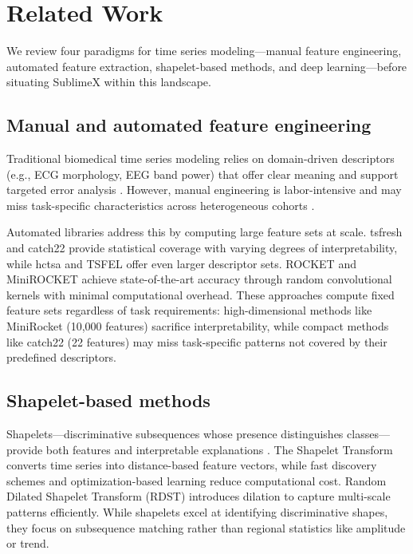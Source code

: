 \documentclass[times, review, 10pt]{elsarticle}
\begin{document}
\section{Related Work}

We review four paradigms for time series modeling---manual feature engineering, automated
feature extraction, shapelet-based methods, and deep learning---before situating SublimeX
within this landscape.

\subsection{Manual and automated feature engineering}
Traditional biomedical time series modeling relies on domain-driven descriptors (e.g., ECG
morphology, EEG band power) that offer clear meaning and support targeted error analysis
\cite{woldaregay2019data, fulcher2018feature}. However, manual engineering is labor-intensive
and may miss task-specific characteristics across heterogeneous cohorts \cite{miotto2018deep}.

Automated libraries address this by computing large feature sets at scale. tsfresh
\cite{christ2018tsfresh} and catch22 \cite{lubba2019catch22} provide statistical coverage with
varying degrees of interpretability, while hctsa and TSFEL \cite{fulcher2017hctsa,
barandas2020tsfel} offer even larger descriptor sets. ROCKET and MiniROCKET
\cite{dempster2020rocket, dempster2021minirocket} achieve state-of-the-art accuracy through
random convolutional kernels with minimal computational overhead. These approaches compute
fixed feature sets regardless of task requirements: high-dimensional methods like MiniRocket
(10,000 features) sacrifice interpretability, while compact methods like catch22 (22 features)
may miss task-specific patterns not covered by their predefined descriptors.

\subsection{Shapelet-based methods}
Shapelets---discriminative subsequences whose presence distinguishes classes---provide both
features and interpretable explanations \cite{ye2009shapelets, hills2014shapelet}. The
Shapelet Transform \cite{hills2014shapelet} converts time series into distance-based feature
vectors, while fast discovery schemes \cite{rakthanmanon2013fast_shapelets} and
optimization-based learning \cite{grabocka2014learning, hou2016efficient_shapelets} reduce
computational cost. Random Dilated Shapelet Transform (RDST) \cite{guillaume2022random}
introduces dilation to capture multi-scale patterns efficiently. While shapelets excel at
identifying discriminative shapes, they focus on subsequence matching rather than regional
statistics like amplitude or trend.
\end{document}
